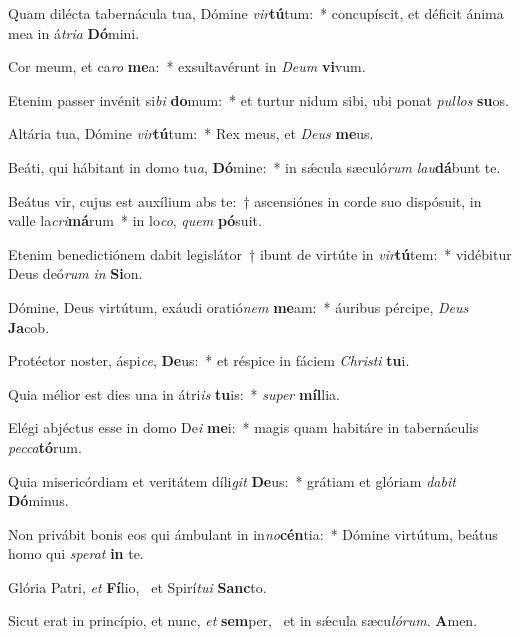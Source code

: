 \item Quam dilécta tabernácula tua, Dómine \textit{vir}\textbf{tú}tum:~* concupíscit, et déficit ánima mea in á\textit{tri}\textit{a} \textbf{Dó}mini.
\item Cor meum, et ca\textit{ro} \textbf{me}a:~* exsultavérunt in \textit{De}\textit{um} \textbf{vi}vum.
\item Etenim passer invénit si\textit{bi} \textbf{do}mum:~* et turtur nidum sibi, ubi ponat \textit{pul}\textit{los} \textbf{su}os.
\item Altária tua, Dómine \textit{vir}\textbf{tú}\-tum:~* Rex meus, et \textit{De}\textit{us} \textbf{me}us.
\item Beáti, qui hábitant in domo tu\textit{a}, \textbf{Dó}mine:~* in sǽcula sæculó\textit{rum} \textit{lau}\textbf{dá}bunt te.
\item Beátus vir, cujus est auxílium abs te:~† ascensiónes in corde suo dispósuit, in valle la\textit{cri}\textbf{má}rum~* in lo\textit{co}, \textit{quem} \textbf{pó}suit.
\item Etenim benedictiónem dabit legislátor~† ibunt de virtúte in \textit{vir}\textbf{tú}tem:~* vidébitur Deus deó\textit{rum} \textit{in} \textbf{Si}on.
\item Dómine, Deus virtútum, exáudi oratió\textit{nem} \textbf{me}am:~* áuribus pércipe, \textit{De}\textit{us} \textbf{Ja}cob.
\item Protéctor noster, áspi\textit{ce}, \textbf{De}us:~* et réspice in fáciem \textit{Chris}\textit{ti} \textbf{tu}i.
\item Quia mélior est dies una in átri\textit{is} \textbf{tu}is:~* \textit{su}\textit{per} \textbf{míl}lia.
\item Elégi abjéctus esse in domo De\textit{i} \textbf{me}i:~* magis quam habitáre in tabernáculis \textit{pec}\textit{ca}\textbf{tó}rum.
\item Quia misericórdiam et veritátem díli\textit{git} \textbf{De}us:~* grátiam et glóriam \textit{da}\textit{bit} \textbf{Dó}minus.
\item Non privábit bonis eos qui ámbulant in in\textit{no}\textbf{cén}tia:~* Dómine virtútum, beátus homo qui \textit{spe}\textit{rat} \textbf{in} te.
\item Glória Patri, \textit{et} \textbf{Fí}lio,~\psstar{} et Spirí\textit{tu}\textit{i} \textbf{Sanc}to.
\item Sicut erat in princípio, et nunc, \textit{et} \textbf{sem}per,~\psstar{} et in sǽcula sæcu\textit{ló}\textit{rum}. \textbf{A}men.